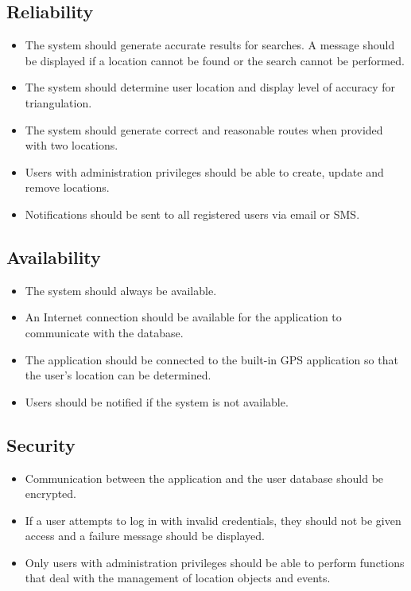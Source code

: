 \subsection{Reliability}
\begin{itemize}
    \item The system should generate accurate results for searches. A message should be displayed if a location cannot be found or the search cannot be performed.
    \item The system should determine user location and display level of accuracy for triangulation.  
    \item The system should generate correct and reasonable routes when provided with two locations.
    \item Users with administration privileges should be able to create, update and remove locations.
    \item Notifications should be sent to all registered users via email or SMS.
\end{itemize}

\subsection{Availability}
\begin{itemize}
    \item The system should always be available.
    \item An Internet connection should be available for the application to communicate with the database.
    \item The application should be connected to the built-in GPS application so that the user's location can be determined.
    \item Users should be notified if the system is not available.
    
\end{itemize}

\subsection{Security}
\begin{itemize}
    \item Communication between the application and the user database should be encrypted.
    \item If a user attempts to log in with invalid credentials, they should not be given access and a failure message should be displayed.
    \item Only users with administration privileges should be able to perform functions that deal with the management of location objects and events.
    
\end{itemize}

